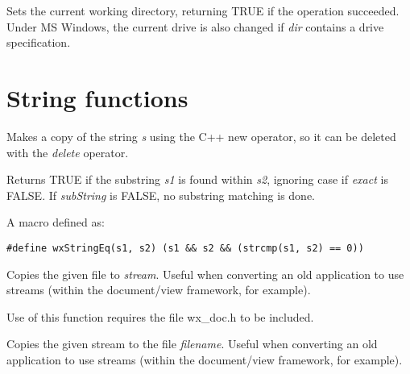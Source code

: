 
Sets the current working directory, returning TRUE if the operation succeeded.
Under MS Windows, the current drive is also changed if {\it dir} contains a drive specification.

\section{String functions}



Makes a copy of the string {\it s} using the C++ new operator, so it can be
deleted with the {\it delete} operator.



Returns TRUE if the substring {\it s1} is found within {\it s2},
ignoring case if {\it exact} is FALSE. If {\it subString} is FALSE,
no substring matching is done.

\label{wxstringeq}


A macro defined as:

\begin{verbatim}
#define wxStringEq(s1, s2) (s1 && s2 && (strcmp(s1, s2) == 0))
\end{verbatim}

\label{wxtransferfiletostream}


Copies the given file to {\it stream}. Useful when converting an old application to
use streams (within the document/view framework, for example).

Use of this function requires the file wx\_doc.h to be included.

\label{wxtransferstreamtofile}


Copies the given stream to the file {\it filename}. Useful when converting an old application to
use streams (within the document/view framework, for example).

